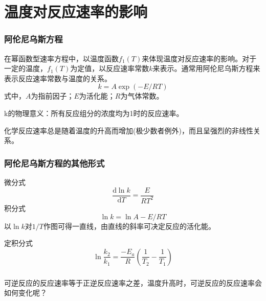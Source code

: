 
\section{温度对反应速率的影响}
\begin{frame}
	\frametitle{阿伦尼乌斯方程}
        在幂函数型速率方程中，以温度函数$f_1(T)$来体现温度对反应速率的影响。对于一定的温度，$f_1(T)$为定值，以反应速率常数$k$来表示。通常用阿伦尼乌斯方程来表示反应速率常数与温度的关系。
    \[
        k = A\exp(-E/RT) 
    \]
    式中，$A$为指前因子；$E$为活化能；$R$为气体常数。
    
    k的物理意义：所有反应组分的浓度均为1时的反应速率。
    
   
    
    化学反应速率总是随着温度的升高而增加(极少数者例外)，而且呈强烈的非线性关系。
\end{frame}


\begin{frame}
	\frametitle{阿伦尼乌斯方程的其他形式}
	微分式
	$$\frac{\mathrm{d}\ln{k}}{\mathrm{d}T} =\frac{E}{RT^2}$$
	积分式
	$$\ln{k}=\ln{A}-E/RT$$
	以$\ln{k}$对$1/T$作图可得一直线，由直线的斜率可决定反应的活化能。
	
	定积分式
	$$\ln\frac{k_2}{k_1}=\frac{-E_a}{R}(\frac{1}{T_2}-\frac{1}{T_1})$$	
\end{frame}


\begin{frame}[t]
    \frametitle{}
    \begin{question}
        可逆反应的反应速率等于正逆反应速率之差，温度升高时，可逆反应的反应速率会如何变化呢？
    \end{question}
\end{frame}


